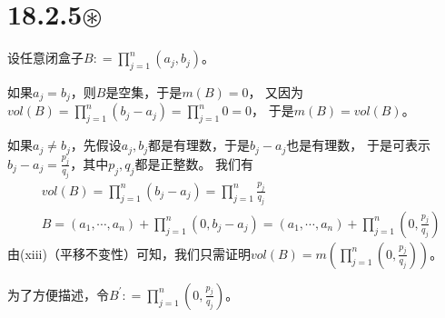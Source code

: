 \documentclass{article}
\begin{document}
\section*{18.2.5$\circledast$}

设任意闭盒子$B : = \prod\limits_{j = 1}^n (a_j, b_j)$。

如果$a_j = b_j$，则$B$是空集，于是$m(B) = 0$，
又因为$vol(B) = \prod\limits_{j = 1}^n (b_j - a_j) = \prod\limits_{j = 1}^n 0 = 0$，
于是$m(B) = vol(B)$。

如果$a_j \neq b_j$，先假设$a_j, b_j$都是有理数，于是$b_j - a_j$也是有理数，
于是可表示$b_j - a_j = \frac{p_j}{q_j}$，其中$p_j, q_j$都是正整数。
我们有
\begin{align*}
   & vol(B) = \prod\limits_{j = 1}^n (b_j - a_j) = \prod\limits_{j = 1}^n \frac{p_j}{q_j}                                              \\
   & B = (a_1, \cdots, a_n) + \prod\limits_{j = 1}^n (0, b_j - a_j) = (a_1, \cdots, a_n) + \prod\limits_{j = 1}^n (0, \frac{p_j}{q_j})
\end{align*}
由(xiii)（平移不变性）可知，我们只需证明$vol(B) = m(\prod\limits_{j = 1}^n (0, \frac{p_j}{q_j}))$。

为了方便描述，令$B^\prime : = \prod\limits_{j = 1}^n (0, \frac{p_j}{q_j})$。
\end{document}

